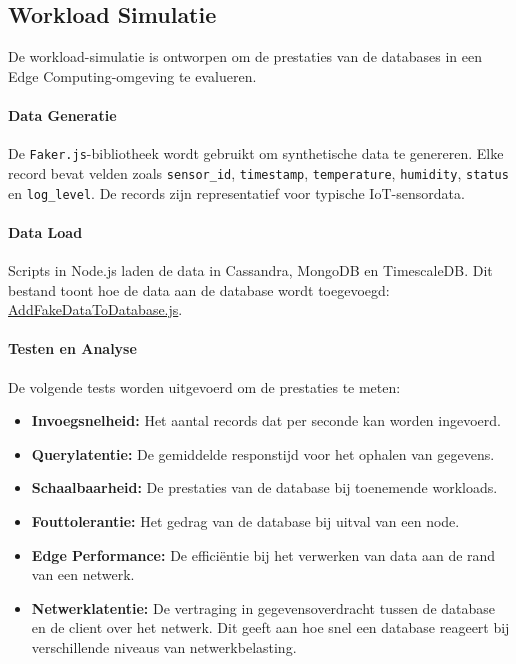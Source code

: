 \subsection{Workload Simulatie}
De workload-simulatie is ontworpen om de prestaties van de databases in een Edge Computing-omgeving te evalueren.

\paragraph{Data Generatie}
De \texttt{Faker.js}-bibliotheek wordt gebruikt om synthetische data te genereren. Elke record bevat velden zoals \texttt{sensor\_id}, \texttt{timestamp}, \texttt{temperature}, \texttt{humidity}, \texttt{status} en \texttt{log\_level}. De records zijn representatief voor typische IoT-sensordata.

\paragraph{Data Load}
Scripts in Node.js laden de data in Cassandra, MongoDB en TimescaleDB. Dit bestand toont hoe de data aan de database wordt toegevoegd: \href{https://github.com/WoutVC/bachelorproef2024/blob/main/proof_of_concept/AddFakeDataToDatabase.js}{AddFakeDataToDatabase.js}.

\paragraph{Testen en Analyse}
De volgende tests worden uitgevoerd om de prestaties te meten:
\begin{itemize}
	\item \textbf{Invoegsnelheid:} Het aantal records dat per seconde kan worden ingevoerd.
	\item \textbf{Querylatentie:} De gemiddelde responstijd voor het ophalen van gegevens.
	\item \textbf{Schaalbaarheid:} De prestaties van de database bij toenemende workloads.
	\item \textbf{Fouttolerantie:} Het gedrag van de database bij uitval van een node.
	\item \textbf{Edge Performance:} De efficiëntie bij het verwerken van data aan de rand van een netwerk.
	\item \textbf{Netwerklatentie:} De vertraging in gegevensoverdracht tussen de database en de client over het netwerk. Dit geeft aan hoe snel een database reageert bij verschillende niveaus van netwerkbelasting.
\end{itemize}

